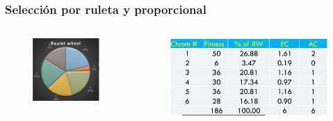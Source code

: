 \documentclass[10pt]{beamer}
\begin{document}
\begin{frame}
  \frametitle{Selección por ruleta y proporcional}

  \begin{columns}
    \begin{column}{0.4\textwidth}
      \begin{figure}[!h] 
        \centering
        \includegraphics[width=1\textwidth]{img/ruleta2}
      \end{figure} 
    \end{column}
    \begin{column}{0.6\textwidth}
      \begin{figure}[!h] 
        \centering
        \includegraphics[width=1\textwidth]{img/ruleta1}
      \end{figure}  
    \end{column}
  \end{columns}

\end{frame}
\end{document}
